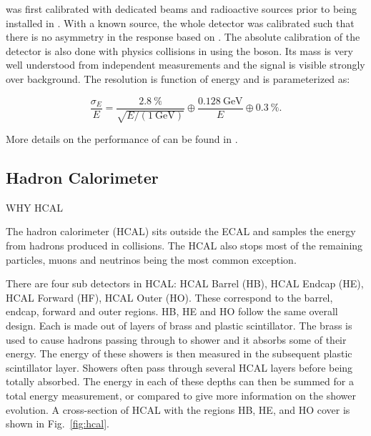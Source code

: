 \ECAL was first calibrated with dedicated beams and radioactive sources prior to being installed in \CMS.  With a known source, the whole detector was calibrated such that there is no asymmetry in the response based on \etaphi. The absolute calibration of the detector is also done with physics collisions in \CMS using the \Z boson. Its mass is very well understood from independent measurements and the signal is visible strongly over background.  The resolution is function of energy and is parameterized as:

\begin{equation}\label{eq:ecal}
    \frac{\sigma_{E}}{E}
    =   
    \frac{\SI{2.8}{\%}}{\sqrt{E/\left(\SI{1}{\GeV}\right)}}
    \oplus
    \frac{\SI{0.128}{\GeV}}{E}
    \oplus
    \SI{0.3}{\%}.
\end{equation}

More details on the performance of \ECAL can be found in \cite{ecalPerf}.

\subsection{Hadron Calorimeter}
\label{subsec:HCAL}
WHY HCAL

The hadron calorimeter (HCAL) sits outside the ECAL and samples the energy from hadrons produced in collisions.  The HCAL also stops most of the remaining particles, muons and neutrinos being the most common exception.

There are four sub detectors in HCAL: HCAL Barrel (HB), HCAL Endcap (HE), HCAL Forward (HF), HCAL Outer (HO).  These correspond to the barrel, endcap, forward and outer regions.  HB, HE and HO follow the same overall design.  Each is made out of layers of brass and plastic scintillator.  The brass is used to cause hadrons passing through to shower and it absorbs some of their energy. The energy of these showers is then measured in the subsequent plastic scintillator layer. Showers often pass through several HCAL layers before being totally absorbed.  The energy in each of these depths can then be summed for a total energy measurement, or compared to give more information on the shower evolution. A cross-section of HCAL with the regions HB, HE, and HO cover is shown in Fig.~\ref{fig:hcal}.

